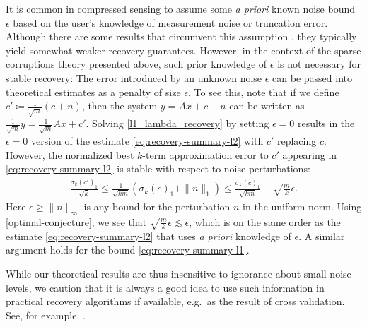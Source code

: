 It is common in compressed sensing to assume some \textit{a priori} known noise bound $\epsilon$ based on the user's knowledge of measurement noise or truncation error.  Although there are some results that circumvent this assumption \cite{AdcockCSFunInterp,Adcockl1Pointwise}, they typically yield somewhat weaker recovery guarantees. However, in the context of the sparse corruptions theory presented above, such prior knowledge of $\epsilon$ is not necessary for stable recovery: The error introduced by an unknown noise $\epsilon$ can be passed into theoretical estimates as a penalty of size $\epsilon$. To see this, note that if we define $c' \coloneqq \frac{1}{\sqrt{m}}(c + n)$, then the system $y = A x + c +n$ can be written as $\frac{1}{\sqrt{m}} y = \frac{1}{\sqrt{m}} A x + c'$. Solving \eqref{l1_lambda_recovery} by setting $\epsilon = 0$ results in the $\epsilon=0$ version of the estimate \eqref{eq:recovery-summary-l2} with $c'$ replacing $c$. However, the normalized best $k$-term approximation error to $c'$ appearing in \eqref{eq:recovery-summary-l2} is stable with respect to noise perturbations:
\begin{align*}
  \frac{\sigma_{k}(c')_{1}}{\sqrt{k}} \leq \frac{1}{\sqrt{k m}} \left( \sigma_{k}(c)_1 + \| n \|_{1}\right) \leq \frac{\sigma_{k}(c)_1}{\sqrt{k m}} + \sqrt{\frac{m}{k}} \epsilon.
\end{align*}
Here $\epsilon \geq \| n \|_{\infty}$ is any bound for the perturbation $n$ in the uniform norm. Using \eqref{optimal-conjecture}, we see that $\sqrt{\frac{m}{k}} \epsilon \lesssim \epsilon$, which is on the same order as the estimate \eqref{eq:recovery-summary-l2} that uses \textit{a priori} knowledge of $\epsilon$. A similar argument holds for the bound \eqref{eq:recovery-summary-l1}. 


While our theoretical results are thus insensitive to ignorance about small noise levels, we caution that it is always a good idea to use such information in practical recovery algorithms if available, e.g.\ as the result of cross validation.  See, for example, \cite{DoostanOwhadiSparse,KarniadakisUQCS,JakemanEtAl_l1Enhance}.  

